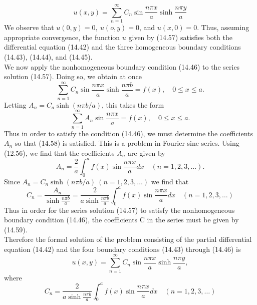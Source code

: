 \documentclass[11pt,a4paper, twoside]{report}
\begin{document}
	\begin{equation}\tag{14.57}
		u(x, y) = \sum_{n=1}^\infty C_n\sin\frac{n\pi x}{a}\sinh\frac{n\pi y}{a}
	\end{equation}
	We observe that $u(0, y) = 0,\ u(o, y) = 0$, and $u(x, 0) = 0$. Thus, assuming appropriate convergence, the function $u$ given by (14.57) satisfies both the differential equation (14.42) and the three homogeneous boundary conditions (14.43), (14.44), and (14.45).\\
	We now apply the nonhomogeneous boundary condition (14.46) to the series solution (14.57). Doing so, we obtain at once
	$$
	\sum_{n=1}^\infty C_n \sin \frac{n\pi x}{a}\sinh\frac{n\pi b}{a} = f(x),\quad 0 \leq x \leq a.
	$$
	Letting $A_n = C_a\sinh(n\pi b/a)$, this takes the form
	\begin{equation}\tag{14.58}
		\sum_{n=1}^\infty A_n\sin\frac{n\pi x}{a} = f(x),\quad 0\leq x \leq a.
	\end{equation}
	Thus in order to satisfy the condition (14.46), we must determine the coefficients $A_n$ so that (14.58) is satisfied. This is a problem in Fourier sine series. Using (12.56), we find that the coefficients $A_n$ are given by
	$$
	A_n = \frac{2}{a}\int_0^a f(x)\sin\frac{n\pi x}{a}dx\quad (n = 1,2,3,\ldots).
	$$
	Since $A_n = C_n\sinh(n\pi b/a)\ (n=1,2,3,\ldots)$ we find  that
	\begin{equation}\tag{14.59}
		C_n = \frac{A_n}{\sinh\frac{n\pi b}{a}} = \frac{2}{a\sinh\frac{n\pi b}{a}}\int_0^af(x)\sin\frac{n\pi x}{a}dx\quad (n=1,2,3,\ldots)
	\end{equation}
	Thus in order for the series solution (14.57) to satisfy the nonhomogeneous boundary condition (14.46), the coefficients C in the series must be given by (14.59).\\ Therefore the formal solution of the problem consisting of the partial differential equation (14.42) and the four boundary conditions (14.43) through (14.46) is
	\begin{equation}\tag{14.57}
		u(x, y) = \sum_{n=1}^\infty C_n\sin\frac{n\pi x}{a}\sinh\frac{n\pi y}{a},
	\end{equation}
	where
	\begin{equation}\tag{14.59}
		C_n = \frac{2}{a\sinh\frac{n\pi b}{a}}\int_0^af(x)\sin\frac{n\pi x}{a}dx\quad (n = 1,2,3,\ldots)
	\end{equation}
\end{document}

